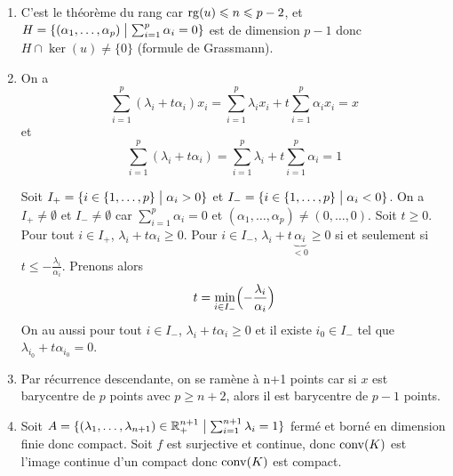 \begin{solution}
	\phantom{}
	\begin{enumerate}
		\item C'est le théorème du rang car $\operatorname{rg}(u)\leqslant n\leqslant p-2$, et $H=\{(\alpha_{1},\dots,\alpha_{p})\bigm|\sum_{i=1}^{p}\alpha_{i}=0\}$ est de dimension $p-1$ donc $H\cap\ker(u)\neq\{0\}$ (formule de Grassmann).
		
		\item On a 
		$$\sum_{i=1}^{p}(\lambda_{i}+t\alpha_{i})x_{i}=\sum_{i=1}^{p}\lambda_{i}x_{i}+t\sum_{i=1}^{p}\alpha_{i}x_{i}=x$$
		et
		$$\sum_{i=1}^{p}(\lambda_{i}+t\alpha_{i})=\sum_{i=1}^{p}\lambda_{i}+t\sum_{i=1}^{p}\alpha_{i}=1$$

		Soit $I_{+}=\{i\in\{1,\dots,p\}\bigm|\alpha_{i}>0\}$ et $I_{-}=\{i\in\{1,\dots,p\}\bigm|\alpha_{i}<0\}$. On a $I_{+}\neq\emptyset$ et $I_{-}\neq\emptyset$ car $\sum_{i=1}^{p}\alpha_{i}=0$ et $(\alpha_{1},\dots,\alpha_{p})\neq(0,\dots,0)$. Soit $t\geqslant0$. Pour tout $i\in I_{+}$, $\lambda_{i}+t\alpha_{i}\geqslant0$. Pour $i\in I_{-}$, $\lambda_{i}+t\underbrace{\alpha_{i}}_{<0}\geqslant 0$ si et seulement si $t\leqslant-\frac{\lambda_{i}}{\alpha_{i}}$. Prenons alors 
		$$t=\min\limits_{i\in I_{-}}\Bigl(-\frac{\lambda_{i}}{\alpha_{i}}\Bigr)$$
		On au aussi pour tout $i\in I_{-}$, $\lambda_{i}+t\alpha_{i}\geqslant 0$ et il existe $i_{0}\in I_{-}$ tel que $\lambda_{i_{0}}+t\alpha_{i_{0}}=0$.

		\item Par récurrence descendante, on se ramène à n+1 points car si $x$ est barycentre de $p$ points avec $p\geqslant n+2$, alors il est barycentre de $p-1$ points.
		
		\item Soit $A=\{(\lambda_{1},\dots,\lambda_{n+1})\in\mathbb{R}_{+}^{n+1}\bigm|\sum_{i=1}^{n+1}\lambda_{i}=1\}$ fermé et borné en dimension finie donc compact. Soit 
		$f$ est surjective et continue, donc $\operatorname{conv}(K)$ est l'image continue d'un compact donc $\operatorname{conv}(K)$ est compact.
	\end{enumerate}
\end{solution}

